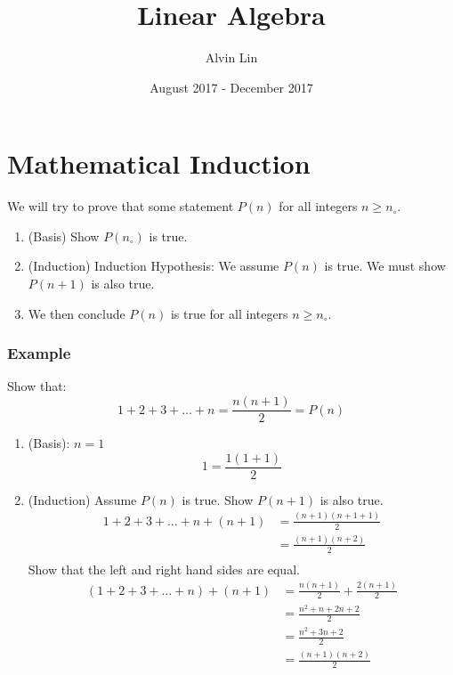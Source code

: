 \documentclass{math}
\title{Linear Algebra}
\author{Alvin Lin}
\date{August 2017 - December 2017}
\begin{document}
\maketitle

\section*{Mathematical Induction}
We will try to prove that some statement \( P(n) \) for all integers \( n \ge
n_{\circ} \).
\begin{enumerate}
  \item (Basis) Show \( P(n_{\circ}) \) is true.
  \item (Induction) Induction Hypothesis: We assume \( P(n) \) is true.
    We must show \( P(n+1) \) is also true.
  \item We then conclude \( P(n) \) is true for all integers
    \( n \ge n_{\circ} \).
\end{enumerate}

\subsubsection*{Example}
Show that:
\[ 1+2+3+\dots+n = \frac{n(n+1)}{2} = P(n) \]
\begin{enumerate}
  \item (Basis): \( n = 1 \)
    \[ 1 = \frac{1(1+1)}{2} \]
  \item (Induction) Assume \( P(n) \) is true. Show \( P(n+1) \) is also true.
    \begin{align*}
      1+2+3+\dots+n+(n+1) &= \frac{(n+1)(n+1+1)}{2} \\
      &= \frac{(n+1)(n+2)}{2} \\
    \end{align*}
    Show that the left and right hand sides are equal.
    \begin{align*}
      (1+2+3+\dots+n)+(n+1) &= \frac{n(n+1)}{2}+\frac{2(n+1)}{2} \\
      &= \frac{n^2+n+2n+2}{2} \\
      &= \frac{n^2+3n+2}{2} \\
      &= \frac{(n+1)(n+2)}{2}
    \end{align*}
\end{enumerate}
\end{document}
